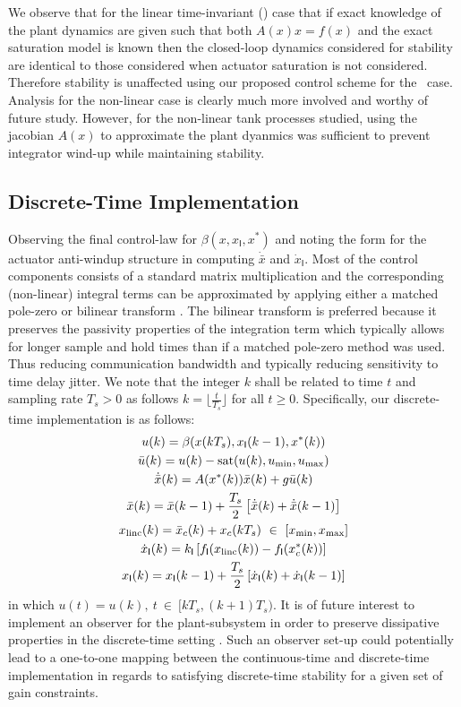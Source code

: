 We observe that for the linear time-invariant (\LTI) case that if 
exact knowledge of the plant dynamics are given such that both
$A(x) x=f(x)$ and the exact saturation model is
known then the closed-loop dynamics considered for stability are
identical to those considered when actuator saturation is not
considered.  Therefore stability is unaffected using our proposed
control scheme for the \LTI\ case.  Analysis for the non-linear case
is clearly much more involved and worthy of future study.  However,
for the non-linear tank processes studied, using the jacobian $A(x)$
to approximate the plant dyanmics was sufficient to prevent integrator
wind-up while maintaining stability.
\subsection{Discrete-Time Implementation}
\label{S:DT_imp}%
Observing the final control-law for $\beta(x,x_{\mathsf{I}},x^*)$ and
noting the form for the actuator anti-windup structure in computing
$\dot{\bar{x}}$ and $\dot{x}_{\mathsf{I}}$.  Most of the control
components consists of a standard matrix multiplication and the
corresponding (non-linear) integral terms can be approximated by
applying either a matched pole-zero or bilinear transform
\cite{franklin06:_feedb_contr_of_dynam_system}.  The bilinear 
transform is preferred because it preserves the passivity properties of the
integration term which typically allows for longer sample and hold
times than if a matched pole-zero method was used.  Thus reducing
communication bandwidth and typically reducing sensitivity to time
delay jitter.  We note that the integer $k$ shall be related to time
$t$ and sampling rate $T_s > 0$ as follows $k=\lfloor \frac{t}{T_s}
\rfloor$ for all $t \geq 0$.  Specifically, our discrete-time
implementation is as  follows:
\begin{gather*}
u(k) = \beta(x(kT_s),x_{\mathsf{I}}(k-1),x^*(k))\\
\bar{u}(k) = u(k) - \operatorname{sat}(u(k),u_{\min},u_{\max})\\
\dot{\bar{x}}(k)=A(x^*(k))\bar{x}(k)+ g \bar{u}(k)\\
\bar{x}(k) = \bar{x}(k-1) + \frac{T_s}{2} \left [
  \dot{\bar{x}}(k) + \dot{\bar{x}}(k-1) \right ]\\
x_{\operatorname{linc}}(k)=\bar{x}_c(k) + x_c(kT_s)\ \in\ [x_{\min},x_{\max}]\\
\dot{x}_{\mathsf{I}}(k)=k_{\mathsf{I}} \left [
  f_{\mathsf{I}}(x_{\operatorname{linc}}(k))-f_{\mathsf{I}}(x^*_c(k)) \right ]\\
x_{\mathsf{I}}(k) = x_{\mathsf{I}}(k-1) + \frac{T_s}{2} \left [
  \dot{x}_{\mathsf{I}}(k) + \dot{x}_{\mathsf{I}}(k-1) \right ]
\end{gather*}
in which $u(t)=u(k),\ t\ \in\ [kT_s,(k+1)T_s)$.  It is of future
interest to implement an observer for the plant-subsystem in order to
preserve dissipative properties in the discrete-time setting
\cite{stramigioli05:_sampl_hamil}.  Such an observer set-up could
potentially lead to a one-to-one mapping between the continuous-time
and discrete-time implementation in regards to satisfying
discrete-time stability for a given set of gain constraints.
